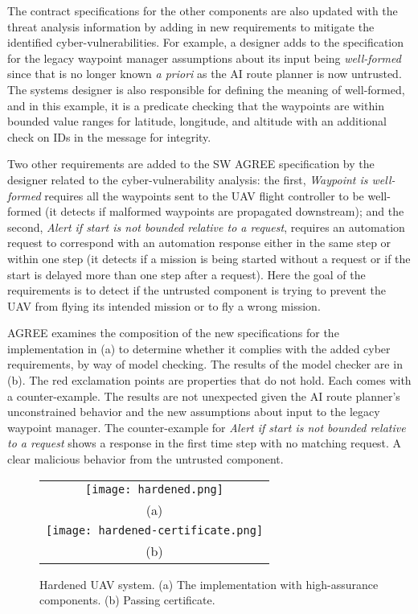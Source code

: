 The contract specifications for the other components are also updated with the threat analysis information by adding in new requirements to mitigate the identified cyber-vulnerabilities. For example, a designer adds to the specification for the legacy waypoint manager assumptions about its input being \emph{well-formed} since that is no longer known \emph{a priori} as the AI route planner is now untrusted. The systems designer is also responsible for defining the meaning of well-formed, and in this example, it is a predicate checking that the waypoints are within bounded value ranges for latitude, longitude, and altitude with an additional check on IDs in the message for integrity.

Two other requirements are added to the SW AGREE specification by the designer related to the cyber-vulnerability analysis: the first, \emph{Waypoint is well-formed} requires all the waypoints sent to the UAV flight controller to be well-formed (it detects if malformed waypoints are propagated downstream); and the second, \emph{Alert if start is not bounded relative to a request}, requires an automation request to correspond with an automation response either in the same step or within one step (it detects if a mission is being started without a request or if the start is delayed more than one step after a request). Here the goal of the requirements is to detect if the untrusted component is trying to prevent the UAV from flying its intended mission or to fly a wrong mission. 

AGREE examines the composition of the new specifications for the implementation in (a) to determine whether it complies with the added cyber requirements, by way of model checking. The results of the model checker are in (b). The red exclamation points are properties that do not hold. Each comes with a counter-example. The results are not unexpected given the AI route planner's unconstrained behavior and the new assumptions about input to the legacy waypoint manager. The counter-example for \emph{Alert if start is not bounded relative to a request} shows a response in the first time step with no matching request. A clear malicious behavior from the untrusted component.

\begin{figure*}
  \begin{center}
    \begin{tabular}{c}
      \texttt{[image: hardened.png]} \\
      (a) \\
      \texttt{[image: hardened-certificate.png]} \\
      (b)
    \end{tabular}
  \end{center}
  \caption{Hardened UAV system. (a) The implementation with high-assurance components. (b) Passing certificate.}
  \label{fig:hardened}
\end{figure*}

